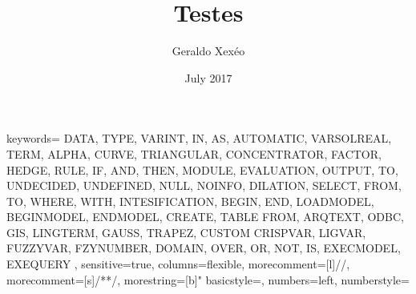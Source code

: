 \documentclass{amsart}
\begin{document}
{
  keywords={
  DATA,
  TYPE,
  VARINT,
  IN,
  AS,
  AUTOMATIC,
  VARSOLREAL,
  TERM,
  ALPHA,
  CURVE,
  TRIANGULAR,
  CONCENTRATOR,
  FACTOR,
  HEDGE,
  RULE,
  IF,
  AND,
  THEN,
  MODULE,
  EVALUATION,
  OUTPUT,
  TO,
  UNDECIDED,
  UNDEFINED,
  NULL,
  NOINFO,
  DILATION,
  SELECT,
  FROM,
  TO,
  WHERE,
  WITH,
  INTESIFICATION,
  BEGIN,
  END,
  LOADMODEL,
  BEGINMODEL,
  ENDMODEL,
  CREATE,
  TABLE
  FROM,
  ARQTEXT,
  ODBC,
  GIS,
  LINGTERM,
  GAUSS,
  TRAPEZ,
  CUSTOM
  CRISPVAR,
  LIGVAR,
  FUZZYVAR,
  FZYNUMBER,
  DOMAIN,
  OVER,
  OR,
  NOT,
  IS,
  EXECMODEL,
  EXEQUERY
  },
  sensitive=true, %
  columns=flexible,
  morecomment=[l]{//}, %
  morecomment=[s]{/*}{*/}, %
  morestring=[b]" %
  basicstyle=\small\ttfamily,
    numbers=left, %
  numberstyle=\tiny\ttfamily %
}




\title{Testes}
\author{Geraldo Xexéo}
\date{July 2017}

\usepackage[utf8]{inputenc}
\end{document}
